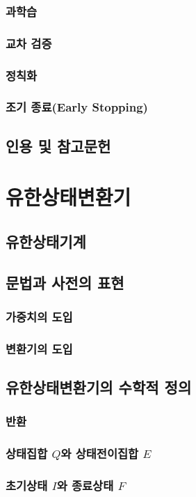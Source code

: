 \documentclass{book}
\begin{document}
\subsection{과학습}
\subsection{교차 검증}
\subsection{정칙화}
\subsection{조기 종료(Early Stopping)}
\section*{인용 및 참고문헌}

\chapter{유한상태변환기}
\section{유한상태기계}
\section{문법과 사전의 표현}
\subsection{가중치의 도입}
\subsection{변환기의 도입}
\section{유한상태변환기의 수학적 정의}
\subsection{반환}
\subsection{상태집합 $Q$와 상태전이집합 $E$}
\subsection{초기상태 $I$와 종료상태 $F$}
\end{document}
